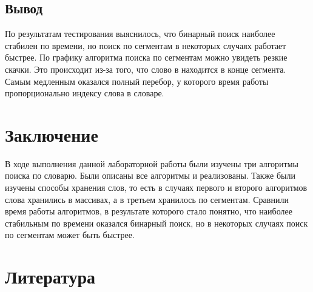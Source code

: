 \documentclass[14pt, a4paper]{extarticle}
\begin{document}
	\subsection*{Вывод}
	По результатам тестирования выяснилось, что бинарный поиск наиболее стабилен по времени, но поиск по сегментам в некоторых случаях работает быстрее. По графику алгоритма поиска по сегментам можно увидеть резкие скачки. Это происходит из-за того, что слово в находится в конце сегмента. Самым медленным оказался полный перебор, у которого время работы пропорционально индексу слова в словаре. 
	
	\clearpage
	\section{Заключение}
	В ходе выполнения данной лабораторной работы были изучены три алгоритмы поиска по словарю. Были описаны все алгоритмы и реализованы. Также были изучены способы хранения слов, то есть в случаях первого и второго алгоритмов слова хранились в массивах, а в третьем хранилось по сегментам. Сравнили время работы алгоритмов, в результате которого стало понятно, что наиболее стабильным по времени оказался бинарный поиск, но в некоторых случаях поиск по сегментам может быть быстрее.
	\clearpage

	\newpage	
	\section*{Литература}
		
\end{document}
